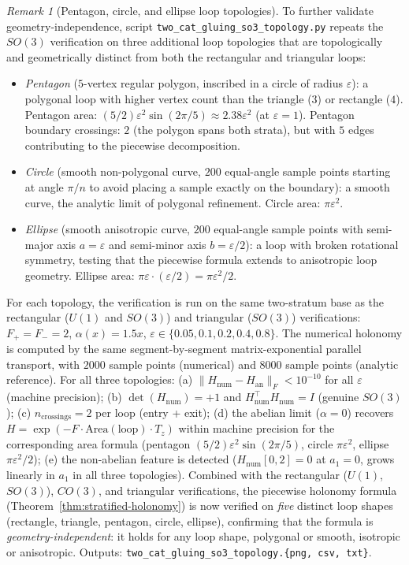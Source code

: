 \documentclass[11pt,a4paper]{article}
\theoremstyle{plain}
\theoremstyle{definition}
\theoremstyle{remark}
\newtheorem{remark}[theorem]{Remark}
\begin{document}
\begin{remark}[Pentagon, circle, and ellipse loop topologies]
\label{rem:2cat-gluing-so3-topology}
To further validate geometry-independence, script
\texttt{two\_cat\_gluing\_so3\_topology.py} repeats the $SO(3)$
verification on three additional loop topologies that are topologically
and geometrically distinct from both the rectangular and triangular
loops:
\begin{itemize}[leftmargin=*, itemsep=2pt]
\item \emph{Pentagon} ($5$-vertex regular polygon, inscribed in a
circle of radius $\varepsilon$): a polygonal loop with higher vertex
count than the triangle ($3$) or rectangle ($4$). Pentagon area:
$(5/2) \varepsilon^2 \sin(2\pi/5) \approx 2.38 \varepsilon^2$ (at
$\varepsilon = 1$). Pentagon boundary crossings: $2$ (the polygon
spans both strata), but with $5$ edges contributing to the piecewise
decomposition.
\item \emph{Circle} (smooth non-polygonal curve, $200$ equal-angle
sample points starting at angle $\pi/n$ to avoid placing a sample
exactly on the boundary): a smooth curve, the analytic limit of
polygonal refinement. Circle area: $\pi \varepsilon^2$.
\item \emph{Ellipse} (smooth anisotropic curve, $200$ equal-angle
sample points with semi-major axis $a = \varepsilon$ and semi-minor
axis $b = \varepsilon/2$): a loop with broken rotational symmetry,
testing that the piecewise formula extends to anisotropic loop
geometry. Ellipse area: $\pi \varepsilon \cdot (\varepsilon/2) =
\pi\varepsilon^2/2$.
\end{itemize}
For each topology, the verification is run on the same two-stratum
base as the rectangular ($U(1)$ and $SO(3)$) and triangular ($SO(3)$)
verifications: $F_+ = F_- = 2$, $\alpha(x) = 1.5 x$, $\varepsilon
\in \{0.05, 0.1, 0.2, 0.4, 0.8\}$. The numerical holonomy is computed
by the same segment-by-segment matrix-exponential parallel transport,
with $2000$ sample points (numerical) and $8000$ sample points
(analytic reference). For all three topologies: (a)
$\|H_{\mathrm{num}} - H_{\mathrm{an}}\|_F < 10^{-10}$ for all
$\varepsilon$ (machine precision); (b) $\det(H_{\mathrm{num}}) = +1$
and $H_{\mathrm{num}}^\top H_{\mathrm{num}} = I$ (genuine $SO(3)$);
(c) $n_{\mathrm{crossings}} = 2$ per loop (entry + exit); (d) the
abelian limit ($\alpha = 0$) recovers $H = \exp(-F \cdot
\mathrm{Area}(\mathrm{loop}) \cdot T_z)$ within machine precision for
the corresponding area formula (pentagon $(5/2)\varepsilon^2
\sin(2\pi/5)$, circle $\pi\varepsilon^2$, ellipse $\pi\varepsilon^2
/2$); (e) the non-abelian feature is detected ($H_{\mathrm{num}}[0,2]
= 0$ at $a_1 = 0$, grows linearly in $a_1$ in all three topologies).
Combined with the rectangular ($U(1)$, $SO(3)$), $CO(3)$, and
triangular verifications, the piecewise holonomy formula
(Theorem~\ref{thm:stratified-holonomy}) is now verified on \emph{five}
distinct loop shapes (rectangle, triangle, pentagon, circle,
ellipse), confirming that the formula is \emph{geometry-independent}: it
holds for any loop shape, polygonal or smooth, isotropic or
anisotropic. Outputs:
\texttt{two\_cat\_gluing\_so3\_topology.\{png, csv, txt\}}.
\end{remark}
\end{document}
